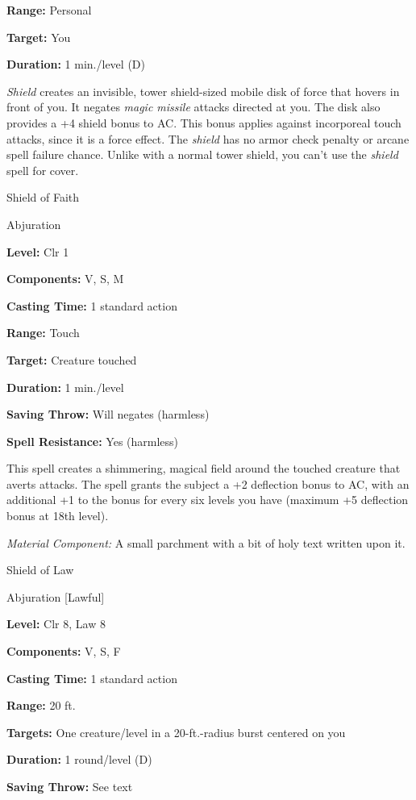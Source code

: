 \documentclass{article}
\begin{document}
\textbf{Range:} Personal

\textbf{Target:} You

\textbf{Duration:} 1 min./level (D)

\textit{Shield }creates an invisible, tower shield-sized mobile disk of force that 
hovers in front of you. It negates \textit{magic missile }attacks directed at you. 
The disk also provides a +4 shield bonus to AC. This bonus applies against incorporeal 
touch attacks, since it is a force effect. The \textit{shield }has no armor check 
penalty or arcane spell failure chance. Unlike with a normal tower shield, you 
can't use the \textit{shield }spell for cover.

\vspace{12pt}
Shield of Faith

Abjuration

\textbf{Level:} Clr 1

\textbf{Components:} V, S, M

\textbf{Casting Time:} 1 standard action

\textbf{Range:} Touch

\textbf{Target:} Creature touched

\textbf{Duration:} 1 min./level

\textbf{Saving Throw: }Will negates (harmless)

\textbf{Spell Resistance:} Yes (harmless)

This spell creates a shimmering, magical field around the touched creature that 
averts attacks. The spell grants the subject a +2 deflection bonus to AC, with 
an additional +1 to the bonus for every six levels you have (maximum +5 deflection 
bonus at 18th level).

\textit{Material Component: }A small parchment with a bit of holy text written 
upon it.

\vspace{12pt}
Shield of Law

Abjuration [Lawful]

\textbf{Level:} Clr 8, Law 8

\textbf{Components:} V, S, F

\textbf{Casting Time:} 1 standard action

\textbf{Range:} 20 ft.

\textbf{Targets:} One creature/level in a 20-ft.-radius burst centered on you

\textbf{Duration:} 1 round/level (D)

\textbf{Saving Throw:} See text
\end{document}
